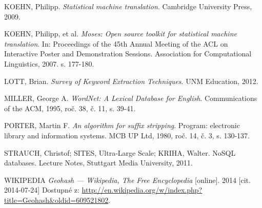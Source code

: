 \begin{thebibliography}{99}
  KOEHN, Philipp. \textit{Statistical machine translation}. Cambridge University Press, 2009.

  KOEHN, Philipp, et al. \textit{Moses: Open source toolkit for statistical machine translation}. In: Proceedings of the 45th Annual Meeting of the ACL on Interactive Poster and Demonstration Sessions. Association for Computational Linguistics, 2007. s. 177-180.

  LOTT, Brian. \textit{Survey of Keyword Extraction Techniques}. UNM Education, 2012.

  MILLER, George A.
  \emph{WordNet: A Lexical Database for English}.
  Communications of the ACM, 1995, roč. 38, č. 11, s. 39-41.


  PORTER, Martin F.
  \emph{An algorithm for suffix stripping}.
  Program: electronic library and information systems. MCB UP Ltd, 1980, roč. 14, č. 3, s. 130-137.

  STRAUCH, Christof; SITES, Ultra-Large Scale; KRIHA, Walter. NoSQL databases. Lecture Notes, Stuttgart Media University, 2011.

  WIKIPEDIA
  \emph{Geohash --- Wikipedia{,} The Free Encyclopedia} [online]. 2014 [cit. 2014-07-24]
  Dostupné z: \url{http://en.wikipedia.org/w/index.php?title=Geohash&oldid=609521802}.


\end{thebibliography}



